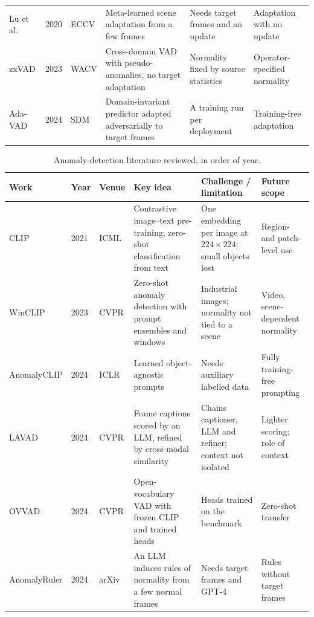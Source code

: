 \documentclass[conference,a4paper]{IEEEtran}
\begin{document}
\begin{table}[!t]
\begin{tabularx}{\textwidth}{@{}W{2.6cm} l W{2.3cm} Z Z Z@{}}
Lu et al.\ \cite{lu2020fewshot} & 2020 & ECCV & Meta-learned scene adaptation from a few frames & Needs target frames and an update & Adaptation with no update \\
zxVAD \cite{aich2023zxvad} & 2023 & WACV & Cross-domain VAD with pseudo-anomalies, no target adaptation & Normality fixed by source statistics & Operator-specified normality \\
Ada-VAD \cite{adavad2024} & 2024 & SDM & Domain-invariant predictor adapted adversarially to target frames & A training run per deployment & Training-free adaptation \\
\bottomrule
\end{tabularx}
\end{table}

\begin{table}[!t]
\caption{Anomaly-detection literature reviewed, in order of year.}
\label{tbl:lit-vad}
\centering
\footnotesize
\begin{tabularx}{\textwidth}{@{}W{2.6cm} l W{1.3cm} Z Z Z@{}}
\toprule
\textbf{Work} & \textbf{Year} & \textbf{Venue} & \textbf{Key idea} & \textbf{Challenge / limitation} & \textbf{Future scope} \\
\midrule
CLIP \cite{radford2021clip} & 2021 & ICML & Contrastive image--text pre-training; zero-shot classification from text & One embedding per image at $224\times224$; small objects lost & Region- and patch-level use \\
WinCLIP \cite{jeong2023winclip} & 2023 & CVPR & Zero-shot anomaly detection with prompt ensembles and windows & Industrial images; normality not tied to a scene & Video, scene-dependent normality \\
AnomalyCLIP \cite{zhou2024anomalyclip} & 2024 & ICLR & Learned object-agnostic prompts & Needs auxiliary labelled data & Fully training-free prompting \\
LAVAD \cite{zanella2024lavad} & 2024 & CVPR & Frame captions scored by an LLM, refined by cross-modal similarity & Chains captioner, LLM and refiner; context not isolated & Lighter scoring; role of context \\
OVVAD \cite{wu2024ovvad} & 2024 & CVPR & Open-vocabulary VAD with frozen CLIP and trained heads & Heads trained on the benchmark & Zero-shot transfer \\
AnomalyRuler \cite{yang2024anomalyruler} & 2024 & arXiv & An LLM induces rules of normality from a few normal frames & Needs target frames and GPT-4 & Rules without target frames \\

\end{tabularx}
\end{table}
\end{document}
